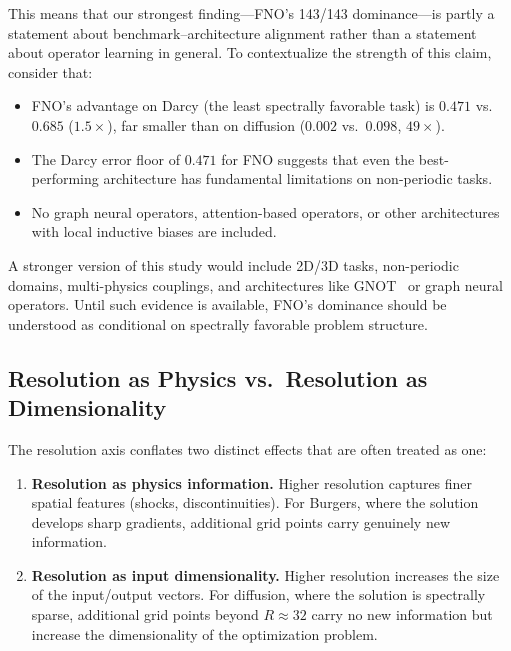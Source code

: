 \documentclass[11pt]{article}
\begin{document}
This means that our strongest finding---FNO's 143/143 dominance---is
partly a statement about benchmark--architecture alignment rather
than a statement about operator learning in general.
To contextualize the strength of this claim, consider that:
\begin{itemize}[leftmargin=*,itemsep=2pt]
  \item FNO's advantage on Darcy (the least spectrally favorable task)
    is $0.471$ vs.\ $0.685$ ($1.5\times$), far smaller than on
    diffusion ($0.002$ vs.\ $0.098$, $49\times$).
  \item The Darcy error floor of $0.471$ for FNO suggests that even
    the best-performing architecture has fundamental limitations on
    non-periodic tasks.
  \item No graph neural operators, attention-based operators, or
    other architectures with local inductive biases are included.
\end{itemize}

A stronger version of this study would include 2D/3D tasks,
non-periodic domains, multi-physics couplings, and architectures like
GNOT~\citep{hao2023gnot} or graph neural operators. Until such
evidence is available, FNO's dominance should be understood as
conditional on spectrally favorable problem structure.

\subsection{Resolution as Physics vs.\ Resolution as Dimensionality}
\label{sec:res-discussion}

The resolution axis conflates two distinct effects that are often
treated as one:

\begin{enumerate}[leftmargin=*,itemsep=2pt]
  \item \textbf{Resolution as physics information.}
    Higher resolution captures finer spatial features (shocks,
    discontinuities). For Burgers, where the solution develops
    sharp gradients, additional grid points carry genuinely new
    information.

  \item \textbf{Resolution as input dimensionality.}
    Higher resolution increases the size of the input/output vectors.
    For diffusion, where the solution is spectrally sparse, additional
    grid points beyond $R \approx 32$ carry no new information but
    increase the dimensionality of the optimization problem.
\end{enumerate}
\end{document}

